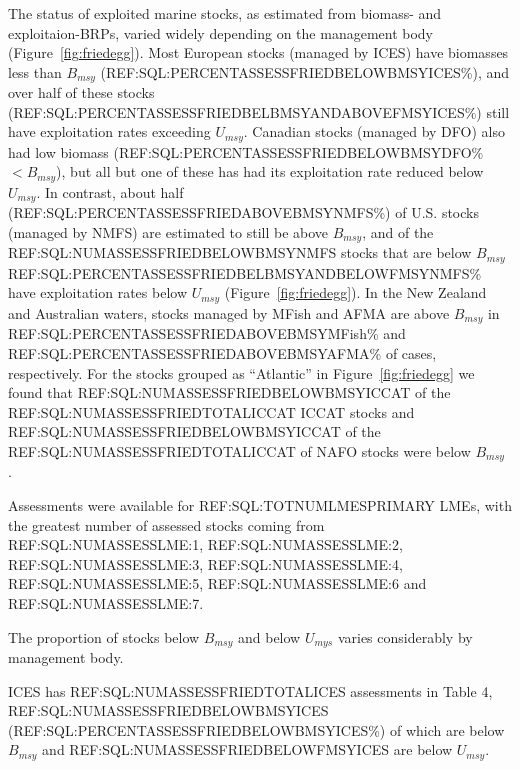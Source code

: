 The status of exploited marine stocks, as estimated from biomass- and
exploitaion-BRPs, varied widely depending on the management body
(Figure~\ref{fig:friedegg}). Most European stocks (managed by
ICES) have biomasses less than $B_{msy}$
(REF:SQL:PERCENTASSESSFRIEDBELOWBMSYICES\%), and over half of these
stocks (REF:SQL:PERCENTASSESSFRIEDBELBMSYANDABOVEFMSYICES\%) still
have exploitation rates exceeding $U_{msy}$. Canadian stocks (managed
by DFO) also had low biomass (REF:SQL:PERCENTASSESSFRIEDBELOWBMSYDFO\%
$< B_{msy}$), but all but one of these has had its exploitation rate
reduced below $U_{msy}$. In contrast, about half
(REF:SQL:PERCENTASSESSFRIEDABOVEBMSYNMFS\%) of U.S. stocks (managed by
NMFS) are estimated to still be above $B_{msy}$, and of the
REF:SQL:NUMASSESSFRIEDBELOWBMSYNMFS stocks that are below $B_{msy}$
REF:SQL:PERCENTASSESSFRIEDBELBMSYANDBELOWFMSYNMFS\% have exploitation
rates below $U_{msy}$ (Figure~\ref{fig:friedegg}). In the New
Zealand and Australian waters, stocks managed by MFish and AFMA are
above $B_{msy}$ in REF:SQL:PERCENTASSESSFRIEDABOVEBMSYMFish\% and
REF:SQL:PERCENTASSESSFRIEDABOVEBMSYAFMA\% of cases, respectively. For
the stocks grouped as ``Atlantic'' in Figure~\ref{fig:friedegg} we
found that REF:SQL:NUMASSESSFRIEDBELOWBMSYICCAT of the
REF:SQL:NUMASSESSFRIEDTOTALICCAT ICCAT stocks and
REF:SQL:NUMASSESSFRIEDBELOWBMSYICCAT of the
REF:SQL:NUMASSESSFRIEDTOTALICCAT of NAFO stocks were below $B_{msy}$ .



Assessments were available for REF:SQL:TOTNUMLMESPRIMARY LMEs, with the greatest number of
assessed stocks coming from REF:SQL:NUMASSESSLME:1,
REF:SQL:NUMASSESSLME:2, REF:SQL:NUMASSESSLME:3,
REF:SQL:NUMASSESSLME:4, REF:SQL:NUMASSESSLME:5, REF:SQL:NUMASSESSLME:6
and REF:SQL:NUMASSESSLME:7.

The proportion of stocks below $B_{msy}$ and below $U_{mys}$ varies considerably by management body. 

ICES has REF:SQL:NUMASSESSFRIEDTOTALICES assessments in Table 4,
REF:SQL:NUMASSESSFRIEDBELOWBMSYICES
(REF:SQL:PERCENTASSESSFRIEDBELOWBMSYICES\%) of which are below
$B_{msy}$ and REF:SQL:NUMASSESSFRIEDBELOWFMSYICES are below
$U_{msy}$.

